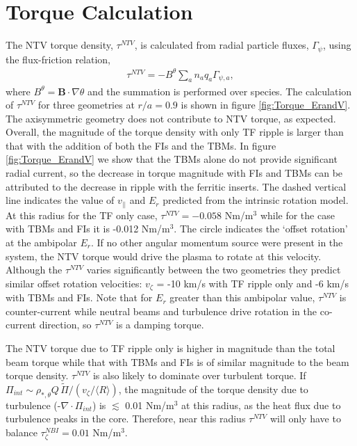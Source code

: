 \documentclass{article}
\begin{document}
\FloatBarrier

\section{Torque Calculation}\label{torque}

The NTV torque density, $\tau^{NTV}$, is calculated from radial particle fluxes, $\Gamma_{\psi}$, using the flux-friction relation,
\begin{gather}
\tau^{NTV} = - B^{\theta} \sum_a n_a q_a \Gamma_{\psi, a},
\end{gather}
where $B^{\theta} = \bm{B} \cdot \nabla \theta$ and the summation is performed over species. The calculation of $\tau^{NTV}$ for three geometries at $r/a = 0.9$ is shown in figure \ref{fig:Torque_ErandV}. The axisymmetric geometry does not contribute to NTV torque, as expected. Overall, the magnitude of the torque density with only TF ripple is larger than that with the addition of both the FIs and the TBMs.  In figure \ref{fig:Torque_ErandV} we show that the TBMs alone do not provide significant radial current, so the decrease in torque magnitude with FIs and TBMs can be attributed to the decrease in ripple with the ferritic inserts. The dashed vertical line indicates the value of $v_{||}$ and $E_r$ predicted from the intrinsic rotation model. At this radius for the TF only case, $\tau^{NTV} = -0.058$ Nm/m$^3$ while for the case with TBMs and FIs it is -0.012 Nm/m$^3$. The circle indicates the `offset rotation' at the ambipolar $E_r$. If no other angular momentum source were present in the system, the NTV torque would drive the plasma to rotate at this velocity. Although the $\tau^{NTV}$ varies significantly between the two geometries they predict similar offset rotation velocities: $v_{\zeta}$ = -10 km/s with TF ripple only and -6 km/s with TBMs and FIs. Note that for $E_r$ greater than this ambipolar value, $\tau^{NTV}$ is counter-current while neutral beams and turbulence drive rotation in the co-current direction, so $\tau^{NTV}$ is a damping torque.

The NTV torque due to TF ripple only is higher in magnitude than the total beam torque while that with TBMs and FIs is of similar magnitude to the beam torque density. $\tau^{NTV}$ is also likely to dominate over turbulent torque. If $\Pi_{int} \sim \rho_{*, \theta} Q\, \widetilde{\Pi}/(v_{\zeta}/\langle R \rangle)$, the magnitude of the torque density due to turbulence (-$\nabla \cdot \Pi_{int}$) is $\lesssim $ 0.01 Nm/m$^3$ at this radius, as the heat flux due to turbulence peaks in the core. Therefore, near this radius $\tau^{NTV}$ will only have to balance $\tau_{\zeta}^{NBI} = 0.01$ Nm/m$^3$. 
\end{document}
